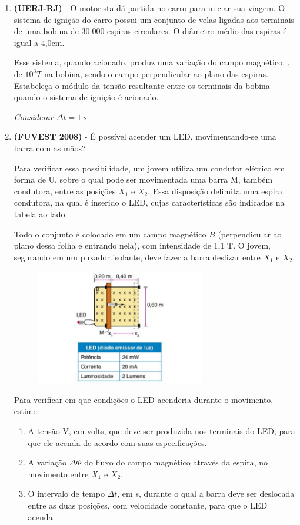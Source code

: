 \documentclass[12pt,letterpaper,fleqn]{article}
\begin{document}
\begin{enumerate}
\item \textbf{(UERJ-RJ)} - O motorista dá partida no carro para iniciar sua viagem. O sistema de ignição do carro possui um conjunto de velas ligadas aos terminais de uma bobina de 30.000 espiras circulares. O diâmetro médio das espiras é igual a 4,0cm.  

Esse sistema, quando acionado, produz uma variação do campo magnético, , de $10^3T$ na bobina, sendo o campo perpendicular ao plano das espiras. Estabeleça o módulo da tensão resultante entre os terminais da bobina quando o sistema de ignição é acionado.

\textit{Considerar $\Delta t = 1\:s$}

\item \textbf{(FUVEST 2008)} - É possível acender um LED, movimentando-se uma barra com as mãos? 

Para verificar essa possibilidade, um jovem utiliza um condutor elétrico em forma de U, sobre o qual pode ser movimentada uma barra M, também condutora, entre as posições $X_1$ e $X_2$. Essa disposição delimita uma espira condutora, na qual é inserido o LED, cujas características são indicadas na tabela ao lado. 

Todo o conjunto é colocado em um campo magnético $B$ (perpendicular ao plano dessa folha e entrando nela), com intensidade de 1,1 T. O jovem, segurando em um puxador isolante, deve fazer a barra deslizar entre $X_1$ e $X_2$. 
\begin{figure}[h]
    \centering
    \includegraphics[width=0.7\textwidth]{ex_12.png}
\end{figure}

Para verificar em que condições o LED acenderia
durante o movimento, estime:

\begin{enumerate}
    \item  A tensão V, em volts, que deve ser produzida nos terminais do LED, para que ele acenda de acordo com suas especificações.
    \item  A variação $\Delta \Phi$ do fluxo do campo magnético através da espira, no movimento entre $X_1$ e $X_2$.
    \item O intervalo de tempo $\Delta t$, em s, durante o qual a barra deve ser deslocada entre as duas posições, com velocidade constante, para que o LED acenda.
\end{enumerate}


\end{enumerate}
\end{document}
